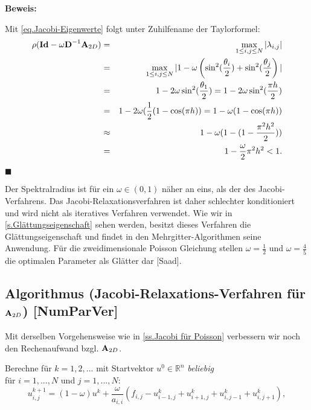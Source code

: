 \textbf{Beweis:}\label{b.Spektral JacobiRelax}

Mit \autoref{eq.Jacobi-Eigenwerte} folgt unter Zuhilfename der Taylorformel:
\begin{eqnarray}
\rho({\textbf{Id}}-\omega{\textbf{D}}^{-1}{\textbf{A}}_{2D}) &=& \max_{1 \le i,j \le N} | \lambda_{i,j} | \notag \\
&=& \max_{1 \le i,j \le N} | 1 - \omega \left(\sin^{2}(\frac {\theta_{i}} {2}) + \sin^{2}(\frac {\theta_{j}} {2} \right) | \notag \\
&=& 1 - 2 \omega \sin^{2} (\frac {\theta_{1}} {2}) = 1 - 2 \omega \sin^{2} (\frac {\pi h} {2}) \notag \\
&=& 1 - 2 \omega (\frac{1} {2} (1 - \cos (\pi h)) = 1 - \omega(1 - \cos (\pi h)) \notag \\
&\approx& 1 - \omega(1-(1-\frac{\pi^{2} h^{2}}{2})) \notag \\
&=& 1 - \frac {\omega} {2} \pi^{2} h^{2} < 1. \notag
\end{eqnarray}
\begin{flushright}
$\blacksquare$
\end{flushright}

Der Spektralradius ist für ein $\omega \in (0,1)$ näher an eins, als der des Jacobi-Verfahrens. Das Jacobi-Relaxationsverfahren ist daher schlechter konditioniert und wird nicht als iteratives Verfahren verwendet. Wie wir in \autoref{s.Glättungseigenschaft} sehen werden, besitzt dieses Verfahren die Glättungseigenschaft und findet in den Mehrgitter-Algorithmen seine Anwendung. Für die zweidimensionale Poisson Gleichung stellen $\omega = \frac{1}{2}$ und $\omega = \frac{4}{5}$ die optimalen Parameter als Glätter dar [Saad].

\subsection{Algorithmus (Jacobi-Relaxations-Verfahren für ${\textbf{A}}_{2D}$) [NumParVer]}\label{ss.Algorithmus Jacobi Relax Poisson}

Mit derselben Vorgehensweise wie in \autoref{ss.Jacobi für Poisson} verbessern wir noch den Rechenaufwand bzgl. ${\textbf{A}}_{2D}$.

Berechne für $k = 1,2,...$ mit Startvektor $u^{0} \in \mathbb{R}^{n}$ \textit{beliebig}\\
für $i = 1,...,N$ und $j = 1,...,N$:
\begin{equation}
u^{k+1}_{i,j} = (1 - \omega)u^{k} + \frac {\omega} {a_{i,i}} (f_{i,j} - u^{k}_{i-1,j} + u^{k}_{i+1,j} + u^{k}_{i,j-1} + u^{k}_{i,j+1}),
\end{equation}

